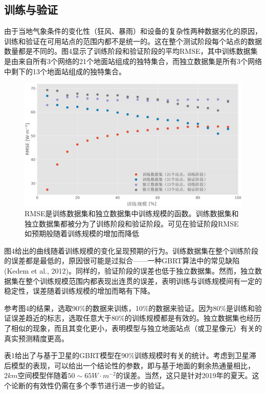 \documentclass[3p,times]{elsarticle}
\begin{document}
\subsection{训练与验证}

由于当地气象条件的变化性（狂风、暴雨）和设备的复杂性两种数据劣化的原因，训练和验证在可用站点的范围内都不是统一的。这在整个测试阶段每个站点的数据数量都是不同的。图4显示了训练阶段和验证阶段的平均RMSE，其中训练数据集是由来自所有3个网络的21个地面站组成的独特集合，而独立数据集是所有3个网络中剩下的13个地面站组成的独特集合。

\begin{figure}[htbp]
    \begin{center}
        \includegraphics[width=\linewidth]{img/图4.png}
    \end{center}
    \caption{RMSE是训练数据集和独立数据集中训练规模的函数。训练数据集和独立数据集都被分为了训练阶段和验证阶段。可见在验证阶段RMSE如预期般随着训练规模的增加而降低}
\end{figure}

图4给出的曲线随着训练规模的变化呈现预期的行为。训练数据集在整个训练阶段的误差都是最低的，原因很可能是过拟合——一种GBRT算法中的常见缺陷(Kedem et al., 2012)。同样的，验证阶段的误差也低于独立数据集。然而，独立数据集在整个训练规模范围内都表现出连贯的误差，表明训练与训练规模间有一定的稳定性，误差随着训练规模的增加而略有下降。

参考图4的结果，选取90\%的数据来训练，10\%的数据来验证。因为80\%是训练和验证误差趋近的标志，选取任意大于80\%的训练规模都是有效的。独立数据集也经历了相似的现象，而且其变化更小，表明模型与独立地面站点（或卫星像元）有关的真实预测精度更高。

表1给出了与基于卫星的GBRT模型在90\%训练规模时有关的统计。考虑到卫星滞后模型的表现，可以给出一个结论性的参数，即与基于地面的剩余热通量相比，$2km$空间模型伴随着$50\sim65 W\cdot m^{-2}$的误差。当然，这只是针对2019年的夏天。这个论断的有效性仍需在多个季节进行进一步的验证。
\end{document}
